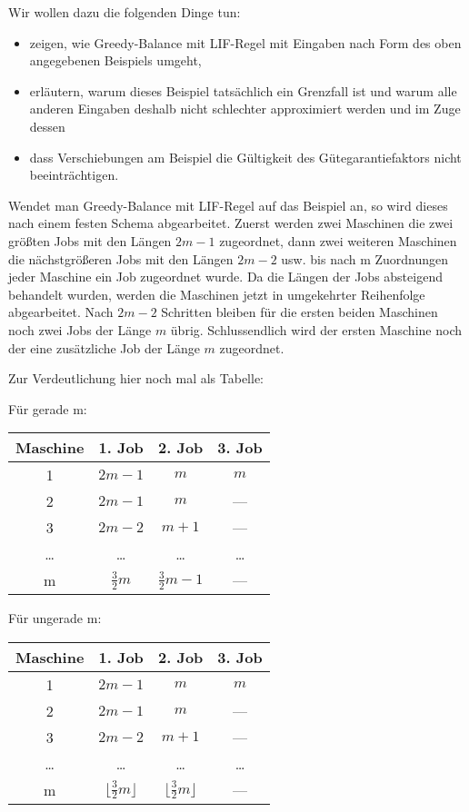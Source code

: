 \documentclass[a4paper]{article}
\begin{document}
	Wir wollen dazu die folgenden Dinge tun:
	\begin{itemize}
	\item zeigen, wie Greedy-Balance mit LIF-Regel mit Eingaben nach Form des oben angegebenen Beispiels umgeht,
	\item erläutern, warum dieses Beispiel tatsächlich ein Grenzfall ist und warum alle anderen Eingaben deshalb nicht schlechter approximiert werden und im Zuge dessen
	\item dass Verschiebungen am Beispiel die Gültigkeit des Gütegarantiefaktors nicht beeinträchtigen.
	\end{itemize}
	
	Wendet man Greedy-Balance mit LIF-Regel auf das Beispiel an, so wird dieses nach einem festen Schema abgearbeitet. Zuerst werden zwei Maschinen die zwei größten Jobs mit den Längen $2m -1$ zugeordnet, dann zwei weiteren Maschinen die nächstgrößeren Jobs mit den Längen $2m - 2$ usw. bis nach m Zuordnungen jeder Maschine ein Job zugeordnet wurde. Da die Längen der Jobs absteigend behandelt wurden, werden die Maschinen jetzt in umgekehrter Reihenfolge abgearbeitet. Nach $2m - 2$ Schritten bleiben für die ersten beiden Maschinen noch zwei Jobs der Länge $m$ übrig. Schlussendlich wird der ersten Maschine noch der eine zusätzliche Job der Länge $m$ zugeordnet. \n
	
	Zur Verdeutlichung hier noch mal als Tabelle:
	\begin{multicols}{2}
	Für gerade m: \n
\begin{tabular}{|c||c|c|c|} \hline
Maschine	&	1. Job 	&	2. Job	&	3. Job	\\ \hline \hline
1			&	$2m-1$	&	$m$		&	$m$		\\ \hline
2			&	$2m-1$	&	$m$		&	---		\\ \hline
3			&	$2m-2$	&	$m+1$	&	---		\\ \hline
\dots		&	\dots	&	\dots	&	\dots	\\ \hline
m			&	$\frac{3}{2}m$ 	&	$\frac{3}{2}m-1$ 	&	---	\\ \hline
\end{tabular}

Für ungerade m: \n
	\begin{tabular}{|c||c|c|c|} \hline
Maschine	&	1. Job 	&	2. Job	&	3. Job	\\ \hline \hline
1			&	$2m-1$	&	$m$		&	$m$		\\ \hline
2			&	$2m-1$	&	$m$		&	---		\\ \hline
3			&	$2m-2$	&	$m+1$	&	---		\\ \hline
\dots		&	\dots	&	\dots	&	\dots	\\ \hline
m			&	$\lfloor \frac{3}{2}m \rfloor$	&	$\lfloor \frac{3}{2}m \rfloor$	&	---	\\ \hline
\end{tabular}
	\end{multicols}
\end{document}
